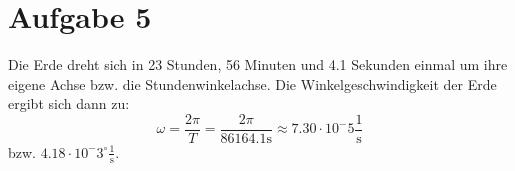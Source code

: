 \section{Aufgabe 5}
Die Erde dreht sich in 23 Stunden, 56 Minuten und 4.1 Sekunden einmal um ihre eigene Achse bzw. die Stundenwinkelachse.
Die Winkelgeschwindigkeit der Erde ergibt sich dann zu:
\begin{equation}
\omega = \frac{2\pi}{T} = \frac{2\pi}{86164.1 \mathrm{s}} \approx 7.30 \cdot 10^-5 \frac{1}{\mathrm{s}}
\end{equation}
bzw. $4.18 \cdot 10^-3 ^{\circ} \frac{1}{\mathrm{s}}$.
